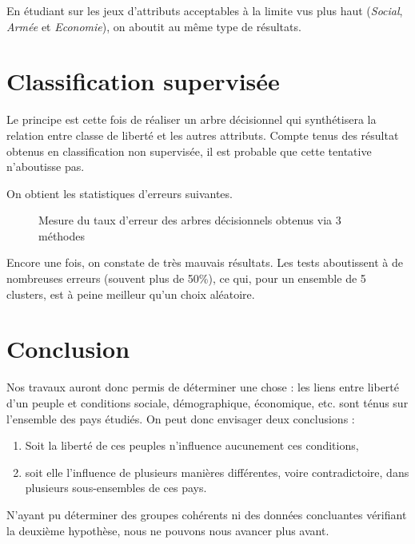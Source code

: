 En étudiant sur les jeux d'attributs \og acceptables à la limite \fg vus plus haut (\emph{Social}, \emph{Armée} et \emph{Economie}), on aboutit au même type de résultats.

\section{Classification supervisée}
Le principe est cette fois de réaliser un arbre décisionnel qui synthétisera la relation entre classe de liberté et les autres attributs. Compte tenus des résultat obtenus en classification non supervisée, il est probable que cette tentative n'aboutisse pas.


On obtient les statistiques d'erreurs suivantes.
\begin{figure}[H]
	\centering
	\caption{Mesure du taux d'erreur des arbres décisionnels obtenus via 3 méthodes}
\end{figure}

Encore une fois, on constate de très mauvais résultats. Les tests aboutissent à de nombreuses erreurs (souvent plus de 50\%), ce qui, pour un ensemble de 5 clusters, est à peine meilleur qu'un choix aléatoire.


\section{Conclusion}
Nos travaux auront donc permis de déterminer une chose : les liens entre liberté d'un peuple et conditions sociale, démographique, économique, etc. sont ténus sur l'ensemble des pays étudiés. On peut donc envisager deux conclusions :
\begin{enumerate}
	\item Soit la liberté de ces peuples n'influence aucunement ces conditions,
	\item soit elle l'influence de plusieurs manières différentes, voire contradictoire, dans plusieurs sous-ensembles de ces pays.
\end{enumerate}
N'ayant pu déterminer des groupes cohérents ni des données concluantes vérifiant la deuxième hypothèse, nous ne pouvons nous avancer plus avant.

